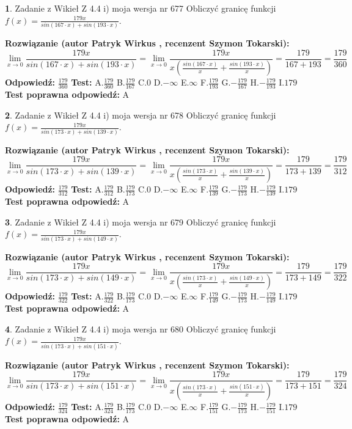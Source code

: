 \documentclass[12pt, a4paper]{article}
\theoremstyle{definition} %
\newtheorem{zad}{}
\newcommand{\zadStart}[1]{\begin{zad}#1\newline}
\newcommand{\zadStop}{\end{zad}}
\newcommand{\rozwStart}[2]{\noindent \textbf{Rozwiązanie (autor #1 , recenzent #2): }\newline}
\newcommand{\rozwStop}{\newline}
\newcommand{\odpStart}{\noindent \textbf{Odpowiedź:}\newline}
\newcommand{\odpStop}{\newline}
\newcommand{\testStart}{\noindent \textbf{Test:}\newline}
\newcommand{\testStop}{\newline}
\newcommand{\kluczStart}{\noindent \textbf{Test poprawna odpowiedź:}\newline}
\newcommand{\kluczStop}{\newline}
\begin{document}
\zadStart{Zadanie z Wikieł Z 4.4 i) moja wersja nr 677}
Obliczyć granicę funkcji $f(x)=\frac{179x}{sin(167\cdot x) +sin(193\cdot x)}$.
\zadStop
\rozwStart{Patryk Wirkus}{Szymon Tokarski}
$$\lim\limits_{x\to 0}\frac{179x}{sin(167\cdot x) +sin(193\cdot x)}=\lim\limits_{x\to 0}\frac{179x}{x(\frac{sin(167\cdot x)}{x}+\frac{sin(193\cdot x)}{x})}=\frac{179}{167+193} = \frac{179}{360}$$
\rozwStop
\odpStart
$\frac{179}{360}$
\odpStop
\testStart
A.$\frac{179}{360}$
B.$\frac{179}{167}$
C.$0$
D.$-\infty$
E.$\infty$
F.$\frac{179}{193}$
G.$-\frac{179}{167}$
H.$-\frac{179}{193}$
I.$179$
\testStop
\kluczStart
A
\kluczStop



\zadStart{Zadanie z Wikieł Z 4.4 i) moja wersja nr 678}
Obliczyć granicę funkcji $f(x)=\frac{179x}{sin(173\cdot x) +sin(139\cdot x)}$.
\zadStop
\rozwStart{Patryk Wirkus}{Szymon Tokarski}
$$\lim\limits_{x\to 0}\frac{179x}{sin(173\cdot x) +sin(139\cdot x)}=\lim\limits_{x\to 0}\frac{179x}{x(\frac{sin(173\cdot x)}{x}+\frac{sin(139\cdot x)}{x})}=\frac{179}{173+139} = \frac{179}{312}$$
\rozwStop
\odpStart
$\frac{179}{312}$
\odpStop
\testStart
A.$\frac{179}{312}$
B.$\frac{179}{173}$
C.$0$
D.$-\infty$
E.$\infty$
F.$\frac{179}{139}$
G.$-\frac{179}{173}$
H.$-\frac{179}{139}$
I.$179$
\testStop
\kluczStart
A
\kluczStop



\zadStart{Zadanie z Wikieł Z 4.4 i) moja wersja nr 679}
Obliczyć granicę funkcji $f(x)=\frac{179x}{sin(173\cdot x) +sin(149\cdot x)}$.
\zadStop
\rozwStart{Patryk Wirkus}{Szymon Tokarski}
$$\lim\limits_{x\to 0}\frac{179x}{sin(173\cdot x) +sin(149\cdot x)}=\lim\limits_{x\to 0}\frac{179x}{x(\frac{sin(173\cdot x)}{x}+\frac{sin(149\cdot x)}{x})}=\frac{179}{173+149} = \frac{179}{322}$$
\rozwStop
\odpStart
$\frac{179}{322}$
\odpStop
\testStart
A.$\frac{179}{322}$
B.$\frac{179}{173}$
C.$0$
D.$-\infty$
E.$\infty$
F.$\frac{179}{149}$
G.$-\frac{179}{173}$
H.$-\frac{179}{149}$
I.$179$
\testStop
\kluczStart
A
\kluczStop



\zadStart{Zadanie z Wikieł Z 4.4 i) moja wersja nr 680}
Obliczyć granicę funkcji $f(x)=\frac{179x}{sin(173\cdot x) +sin(151\cdot x)}$.
\zadStop
\rozwStart{Patryk Wirkus}{Szymon Tokarski}
$$\lim\limits_{x\to 0}\frac{179x}{sin(173\cdot x) +sin(151\cdot x)}=\lim\limits_{x\to 0}\frac{179x}{x(\frac{sin(173\cdot x)}{x}+\frac{sin(151\cdot x)}{x})}=\frac{179}{173+151} = \frac{179}{324}$$
\rozwStop
\odpStart
$\frac{179}{324}$
\odpStop
\testStart
A.$\frac{179}{324}$
B.$\frac{179}{173}$
C.$0$
D.$-\infty$
E.$\infty$
F.$\frac{179}{151}$
G.$-\frac{179}{173}$
H.$-\frac{179}{151}$
I.$179$
\testStop
\kluczStart
A
\kluczStop
\end{document}
